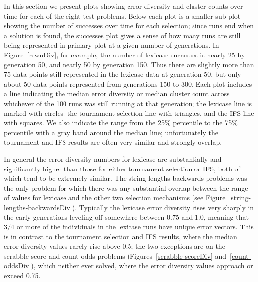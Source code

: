 In this section we present plots showing error diversity and cluster counts over time for each of
the eight test problems. Below each plot is a smaller sub-plot showing the number of successes 
over time for each selection; since runs end when a solution is found, the successes plot gives a
sense of how many runs are still being represented in primary plot at a given number of generations.
In Figure~\ref{rswnDiv}, for example, the number of lexicase successes is nearly 25 by generation
50, and nearly 50 by generation 150. Thus there are slightly more than 75 data points still represented
in the lexicase data at generation 50, but only about 50 data points represented from generations 150
to 300. Each plot includes a line indicating the median error diversity or median cluster count across
whichever of the 100 runs was still running at that generation; the lexicase line is marked with circles,
the tournament selection line with triangles, and the IFS line with squares. We also indicate the 
range from the 25\% percentile to the 75\% percentile with a gray band around the median line; 
unfortunately the tournament and IFS results are often very similar and strongly overlap.

In general the error diversity numbers for lexicase are substantially and significantly
higher than those for either tournament selection or IFS, both of which tend to be extremely similar.
The string-lengths-backwards problems was the only problem for which there was any substantial overlap 
between the range of values for lexicase and the other two selection mechanisms (see 
Figure~\ref{string-lengths-backwardsDiv}). Typically the lexicase error diversity rises very sharply
in the early generations leveling off somewhere between 0.75 and 1.0, meaning that $3/4$ or
more of the individuals in the lexicase runs have unique error vectors. This is in contrast
to the tournament selection and IFS results, where the median error diversity values rarely rise above
0.5; the two exceptions are on the scrabble-score and count-odds problems 
(Figures~\ref{scrabble-scoreDiv} and~\ref{count-oddsDiv}), which neither ever
solved, where the error diversity values approach or exceed 0.75.


